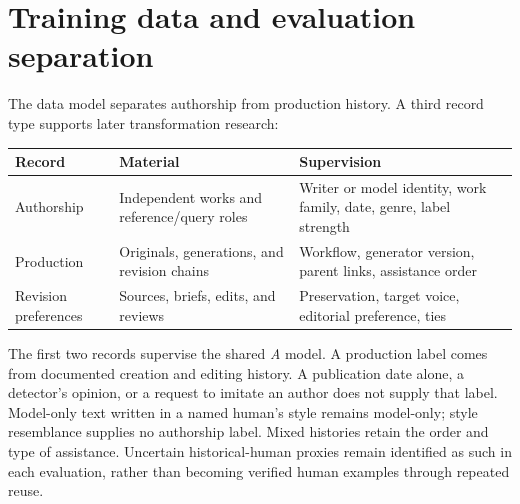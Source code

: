 \section{Training data and evaluation separation}\label{training-data-and-evaluation-separation}

The data model separates authorship from production history. A third record
type supports later transformation research:

\par\medskip\noindent
\begin{tabularx}{\linewidth}{@{}LLL@{}}
\toprule
Record & Material & Supervision \\
\midrule
Authorship & Independent works and reference/query roles & Writer or model
identity, work family, date, genre, label strength \\
Production & Originals, generations, and revision chains & Workflow,
generator version, parent links, assistance order \\
Revision preferences & Sources, briefs, edits, and reviews & Preservation,
target voice, editorial preference, ties \\
\bottomrule
\end{tabularx}
\par\medskip

The first two records supervise the shared \textit{A} model. A production label
comes from documented creation and editing history. A publication date alone,
a detector's opinion, or a request to imitate an author does not supply that
label. Model-only text written in a named human's style remains model-only;
style resemblance supplies no authorship label. Mixed histories retain the
order and type of assistance. Uncertain historical-human proxies remain
identified as such in each evaluation, rather than becoming verified human
examples through repeated reuse.

